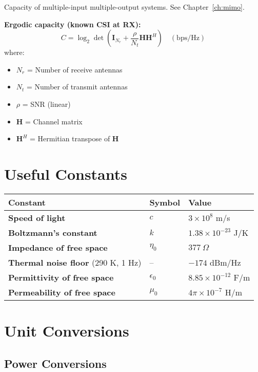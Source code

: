 Capacity of multiple-input multiple-output systems. See Chapter~\ref{ch:mimo}.

\textbf{Ergodic capacity (known CSI at RX):}
\begin{equation}
C = \log_2 \det\left(\mathbf{I}_{N_r} + \frac{\rho}{N_t} \mathbf{HH}^H\right) \quad (\text{bps/Hz})
\label{eq:mimo-capacity}
\end{equation}
where:
\begin{itemize}
\item $N_r$ = Number of receive antennas
\item $N_t$ = Number of transmit antennas
\item $\rho$ = SNR (linear)
\item $\mathbf{H}$ = Channel matrix
\item $\mathbf{H}^H$ = Hermitian transpose of $\mathbf{H}$
\end{itemize}

\section{Useful Constants}
\label{sec:useful-constants}

\begin{center}
\begin{tabular}{@{}lll@{}}
\toprule
Constant & Symbol & Value \\
\midrule
\textbf{Speed of light} & $c$ & $3 \times 10^8$ m/s \\
\textbf{Boltzmann's constant} & $k$ & $1.38 \times 10^{-23}$ J/K \\
\textbf{Impedance of free space} & $\eta_0$ & $377\ \Omega$ \\
\textbf{Thermal noise floor} (290 K, 1 Hz) & -- & $-174$ dBm/Hz \\
\textbf{Permittivity of free space} & $\epsilon_0$ & $8.85 \times 10^{-12}$ F/m \\
\textbf{Permeability of free space} & $\mu_0$ & $4\pi \times 10^{-7}$ H/m \\
\bottomrule
\end{tabular}
\end{center}

\section{Unit Conversions}
\label{sec:unit-conversions}

\subsection{Power Conversions}

